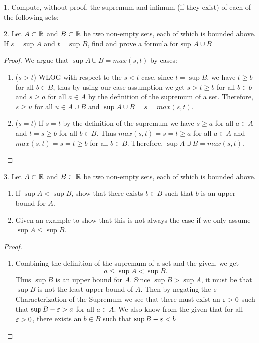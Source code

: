 

1. Compute, without proof, the supremum and infimum (if they exist) of each of the following sets:

2. Let $A \subset \mathbb{R}$ and $B \subset \mathbb{R}$ be two non-empty sets, each of which is bounded above. If $s=\text{sup }A $ and $t=\text{sup }B $, find and prove a formula for $\text{sup } A \cup B$

\begin{proof}
	We argue that $\sup A \cup B = max\left( s, t \right) $ by cases:
	\begin{enumerate}
		\item ($s>t$) WLOG with respect to the $s < t$ case, since $t=\sup B$, we have  $t \ge b$ for all $b \in B$, thus by using our case assumption we get $s > t \ge b$ for all $b \in b$ and $s \ge  a$ for all $a \in A$ by the definition of the supremum of a set. Therefore, $s \ge u$ for all $u \in A \cup B$ and $\sup A \cup B = s = max\left( s, t \right) $.
		\item ($s = t$) If $s=t$ by the definition of the supremum we have $s \ge a$ for all $a \in A$ and $t = s \ge b$ for all $b \in B$. Thus  $max\left( s, t \right) = s = t \ge a$ for all $a \in A$ and $max\left( s, t \right) = s = t \ge b$ for all $b \in B$. Therefore, $\sup A \cup B = max\left( s, t \right) $.
	\end{enumerate}
\end{proof}

3. Let $A \subset \mathbb{R}$ and $B \subset \mathbb{R}$ be two non-empty sets, each of which is bounded above. 
\begin{enumerate}
	\item If $\sup A < \sup B$, show that there exists $b \in B$ such that $b$ is an upper bound for $A$.
	\item Given an example to show that this is not always the case if we only assume $\sup A \le \sup B$.
\end{enumerate}

\begin{proof}
	\begin{enumerate}
		\item Combining the definition of the supremum of a set and the given, we get
			\[
				a \le \sup A < \sup B 
			.\] 
			Thus $\sup B$ is an upper bound for $A$. Since $\sup B > \sup A$, it must be that $\sup B$ is not the least upper bound of $A$. Then by negating the $\e$ Characterization of the Supremum we see that there must exist an $\e > 0 $ such that $\sup B - \e > a$ for all $a \in A$. We also know from the given that for all $\e > 0 $, there exists an $b \in B$ such that $\sup B - \e < b$  
	\end{enumerate}
\end{proof}

